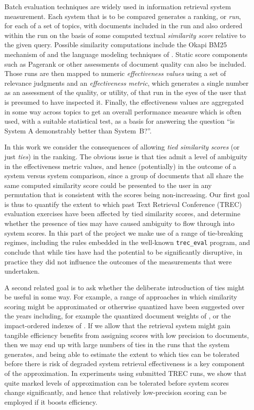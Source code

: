 \documentclass[runningheads,a4paper]{llncs}
\newcommand{\treceval}{{\tt\small{trec\_eval}}}
\begin{document}
Batch evaluation techniques are widely used in information retrieval
system measurement.
Each system that is to be compared generates a ranking, or
{\emph{run}}, for each of a set of topics, with documents included in
the run and also ordered within the run on the basis of some computed
textual {\emph{similarity score}} relative to the given query.
Possible similarity computations include the Okapi BM25 mechanism of
{\citet{rwjhg94trec}} and the language modeling techniques of
{\citet{pc98sigir}}.
Static score components such as Pagerank or other assessments of
document quality can also be included.
Those runs are then mapped to numeric {\emph{effectiveness values}}
using a set of relevance judgments and an {\emph{effectiveness
metric}}, which generates a single number as an assessment of the
quality, or utility, of that run in the eyes of the user that is
presumed to have inspected it.
Finally, the effectiveness values are aggregated in some way across
topics to get an overall performance measure which is often used,
with a suitable statistical test, as a basis for answering the
question ``is System A demonstrably better than System~B?''.

In this work we consider the consequences of allowing {\emph{tied
similarity scores}} (or just {\emph{ties}}) in the ranking.
The obvious issue is that ties admit a level of ambiguity in the
effectiveness metric values, and hence (potentially) in the outcome
of a system versus system comparison, since a group of documents that
all share the same computed similarity score could be presented to
the user in any permutation that is consistent with the scores being
non-increasing.
Our first goal is thus to quantify the extent to which past Text
Retrieval Conference (TREC) evaluation exercises have been affected
by tied similarity scores, and determine whether the presence of
ties may have caused ambiguity to flow through into system
scores.
In this part of the project we make use of a range of tie-breaking
regimes, including the rules embedded in the well-known
{\treceval} program, and conclude that while ties have had the
potential to be significantly disruptive, in practice they did not
influence the outcomes of the measurements that were undertaken.

A second related goal is to ask whether the deliberate introduction
of ties might be useful in some way.
For example, a range of approaches in which similarity scoring might
be approximated or otherwise quantized have been suggested over the
years including, for example
the quantized document weights of {\citet{mzs94ipm}}, or
the impact-ordered indexes of {\citet{am06sigir}}.
If we allow that the retrieval system might gain tangible efficiency
benefits from assigning scores with low precision to
documents,
then we may end up with large
numbers of ties in the runs that the system generates,
and being able to estimate the extent to which ties can
be tolerated before there is risk of degraded system retrieval
effectiveness is a key component of the approximation.
In experiments using submitted TREC runs, we show that quite marked
levels of approximation can be tolerated before system scores change
significantly, and hence that relatively low-precision scoring can be
employed if it boosts efficiency.
\end{document}
